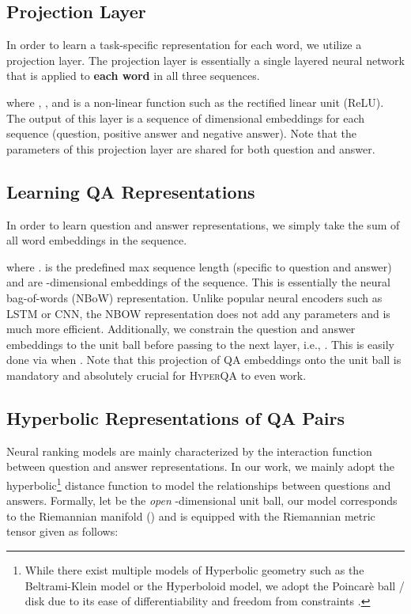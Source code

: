 \documentclass[sigconf]{acmart}
\begin{document}
\subsection{Projection Layer}
In order to learn a task-specific representation for each word, we utilize a projection layer. The projection layer is essentially a single layered neural network that is applied to \textbf{each word} in all three sequences. 


where , ,  and  is a non-linear function such as the rectified linear unit (ReLU). The output of this layer is a sequence of  dimensional embeddings for each sequence (question, positive answer and negative answer). Note that the parameters of this projection layer are shared for both question and answer. 

\subsection{Learning QA Representations}
In order to learn question and answer representations, we simply take the sum of all word embeddings in the sequence. 

\label{qa_sec}
where .  is the predefined max sequence length (specific to question and answer) and  are -dimensional embeddings of the sequence. This is essentially the neural bag-of-words (NBoW) representation. Unlike popular neural encoders such as LSTM or CNN, the NBOW representation does not add any parameters and is much more efficient. Additionally, we constrain the question and answer embeddings to the unit ball before passing to the next layer, i.e.,  . This is easily done via   when . Note that this projection of QA embeddings onto the unit ball is mandatory and absolutely crucial for \textsc{HyperQA} to even work. 

\subsection{Hyperbolic Representations of QA Pairs}
Neural ranking models are mainly characterized by the interaction function between question and answer representations. In our work, we mainly adopt the hyperbolic\footnote{While there exist multiple models of Hyperbolic geometry such as the Beltrami-Klein model or the Hyperboloid model, we adopt the Poincar\`e ball / disk due to its ease of differentiability and freedom from constraints \cite{DBLP:journals/corr/NickelK17}.} distance function to model the relationships between questions and answers. Formally, let  be the \textit{open} -dimensional unit ball, our model corresponds to the Riemannian manifold () and is equipped with the Riemannian metric tensor given as follows:
\end{document}

